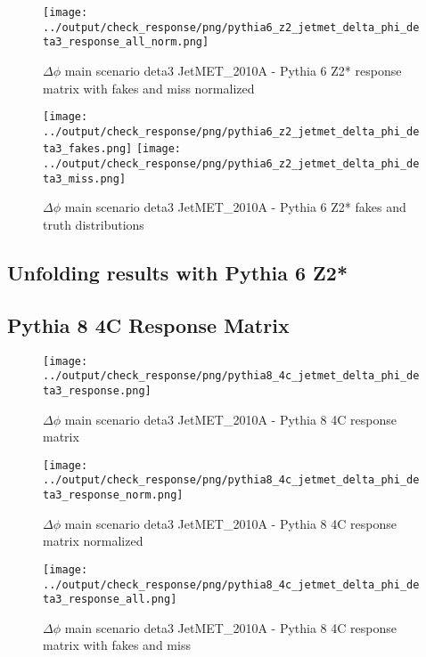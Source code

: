 \documentclass[11pt]{book}
\begin{document}
\begin{figure}[ht]
\centering
\texttt{[image: ../output/check\_response/png/pythia6\_z2\_jetmet\_delta\_phi\_deta3\_response\_all\_norm.png]}
\caption{$\Delta\phi$ main scenario deta3 JetMET\_2010A - Pythia 6 Z2* response matrix with fakes and miss normalized}
\label{p6_jetmet_delta_phi_deta3_response_all_norm}
\end{figure}

\begin{figure}[ht]
\centering
\texttt{[image: ../output/check\_response/png/pythia6\_z2\_jetmet\_delta\_phi\_deta3\_fakes.png]}
\texttt{[image: ../output/check\_response/png/pythia6\_z2\_jetmet\_delta\_phi\_deta3\_miss.png]}
\caption{$\Delta\phi$ main scenario deta3 JetMET\_2010A - Pythia 6 Z2* fakes and truth distributions}
\label{p6_jetmet_delta_phi_deta3_fakesmiss}
\end{figure}


\clearpage
\subsection{Unfolding results with Pythia 6 Z2*}


\clearpage
\subsection{Pythia 8 4C Response Matrix}


\begin{figure}[ht]
\centering
\texttt{[image: ../output/check\_response/png/pythia8\_4c\_jetmet\_delta\_phi\_deta3\_response.png]}
\caption{$\Delta\phi$ main scenario deta3 JetMET\_2010A - Pythia 8 4C response matrix}
\label{p8_jetmet_delta_phi_deta3_response}
\end{figure}

\begin{figure}[ht]
\centering
\texttt{[image: ../output/check\_response/png/pythia8\_4c\_jetmet\_delta\_phi\_deta3\_response\_norm.png]}
\caption{$\Delta\phi$ main scenario deta3 JetMET\_2010A - Pythia 8 4C response matrix normalized}
\label{p8_jetmet_delta_phi_deta3_response_norm}
\end{figure}

\begin{figure}[ht]
\centering
\texttt{[image: ../output/check\_response/png/pythia8\_4c\_jetmet\_delta\_phi\_deta3\_response\_all.png]}
\caption{$\Delta\phi$ main scenario deta3 JetMET\_2010A - Pythia 8 4C response matrix with fakes and miss}
\label{p8_jetmet_delta_phi_deta3_response_all}
\end{figure}
\end{document}
